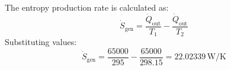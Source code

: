The entropy production rate is calculated as:  
\[
\dot{S}_{\text{gen}} = \frac{\dot{Q}_{\text{out}}}{T_1} - \frac{\dot{Q}_{\text{out}}}{T_2}
\]  
Substituting values:  
\[
\dot{S}_{\text{gen}} = \frac{65000}{295} - \frac{65000}{298.15} = 22.02339 \, \text{W/K}
\]